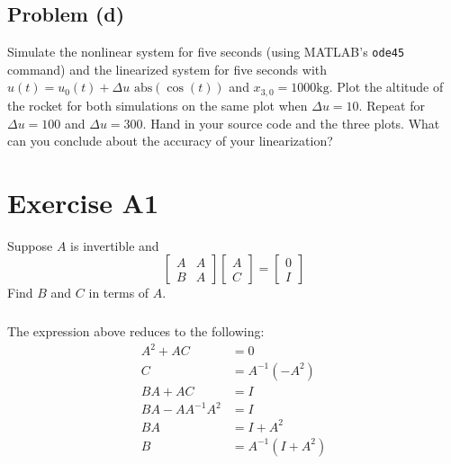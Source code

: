 \documentclass[11pt]{article}
\begin{document}
\subsection*{Problem (d)}
Simulate the nonlinear system for five seconds (using MATLAB's \texttt{ode45} command) and the linearized system for five seconds with $u(t)=u_0(t)+\Delta u\text{ abs}(\cos(t))$ and $x_{3,0}=1000\text{kg}$. Plot the altitude of the rocket for both simulations on the same plot when $\Delta u=10$. Repeat for $\Delta u=100$ and $\Delta u=300$. Hand in your source code and the three plots. What can you conclude about the accuracy of your linearization?

\section*{Exercise A1}
Suppose $A$ is invertible and 
\begin{equation*}
	\begin{bmatrix} A & A \\ B & A \end{bmatrix} \begin{bmatrix} A \\ C \end{bmatrix} = \begin{bmatrix} 0 \\ I \end{bmatrix}
\end{equation*}
Find $B$ and $C$ in terms of $A$.

\subparagraph*{}
The expression above reduces to the following:
\begin{align*}
	A^2 + AC &= 0 \\
	C &= A^{-1}(-A^2) \\
	BA + AC &= I \\
	BA - AA^{-1}A^2 &= I \\
	BA &= I + A^2 \\
	B &= A^{-1}(I+A^2)
\end{align*}
\end{document}
